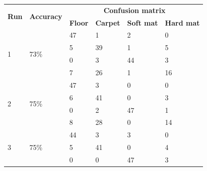 \documentclass[USenglish]{ifimaster}  %
\begin{document}
\begin{table}[h]
	\centering
	\begin{tabular}{@{}llllll@{}}
		\toprule
		\multirow{2}{*}{\textbf{Run}} & \multirow{2}{*}{\textbf{Accuracy}} & \multicolumn{4}{c}{\textbf{Confusion matrix}} \\ \cmidrule(l){3-6} 
		&  & \multicolumn{1}{l|}{\textbf{Floor}} & \multicolumn{1}{l|}{\textbf{Carpet}} & \multicolumn{1}{l|}{\textbf{Soft mat}} & \textbf{Hard mat} \\ \midrule
		\multicolumn{1}{l|}{\multirow{4}{*}{1}} & \multicolumn{1}{l|}{\multirow{4}{*}{73\%}} & \multicolumn{1}{l|}{47} & \multicolumn{1}{l|}{1} & \multicolumn{1}{l|}{2} & 0 \\ \cmidrule(l){3-6} 
		\multicolumn{1}{l|}{} & \multicolumn{1}{l|}{} & \multicolumn{1}{l|}{5} & \multicolumn{1}{l|}{39} & \multicolumn{1}{l|}{1} & 5 \\ \cmidrule(l){3-6} 
		\multicolumn{1}{l|}{} & \multicolumn{1}{l|}{} & \multicolumn{1}{l|}{0} & \multicolumn{1}{l|}{3} & \multicolumn{1}{l|}{44} & 3 \\ \cmidrule(l){3-6} 
		\multicolumn{1}{l|}{} & \multicolumn{1}{l|}{} & \multicolumn{1}{l|}{7} & \multicolumn{1}{l|}{26} & \multicolumn{1}{l|}{1} & 16 \\ \midrule
		\multicolumn{1}{l|}{\multirow{4}{*}{2}} & \multicolumn{1}{l|}{\multirow{4}{*}{75\%}} & \multicolumn{1}{l|}{47} & \multicolumn{1}{l|}{3} & \multicolumn{1}{l|}{0} & 0 \\ \cmidrule(l){3-6} 
		\multicolumn{1}{l|}{} & \multicolumn{1}{l|}{} & \multicolumn{1}{l|}{6} & \multicolumn{1}{l|}{41} & \multicolumn{1}{l|}{0} & 3 \\ \cmidrule(l){3-6} 
		\multicolumn{1}{l|}{} & \multicolumn{1}{l|}{} & \multicolumn{1}{l|}{0} & \multicolumn{1}{l|}{2} & \multicolumn{1}{l|}{47} & 1 \\ \cmidrule(l){3-6} 
		\multicolumn{1}{l|}{} & \multicolumn{1}{l|}{} & \multicolumn{1}{l|}{8} & \multicolumn{1}{l|}{28} & \multicolumn{1}{l|}{0} & 14 \\ \midrule
		\multicolumn{1}{l|}{\multirow{4}{*}{3}} & \multicolumn{1}{l|}{\multirow{4}{*}{75\%}} & \multicolumn{1}{l|}{44} & \multicolumn{1}{l|}{3} & \multicolumn{1}{l|}{3} & 0 \\ \cmidrule(l){3-6} 
		\multicolumn{1}{l|}{} & \multicolumn{1}{l|}{} & \multicolumn{1}{l|}{5} & \multicolumn{1}{l|}{41} & \multicolumn{1}{l|}{0} & 4 \\ \cmidrule(l){3-6} 
		\multicolumn{1}{l|}{} & \multicolumn{1}{l|}{} & \multicolumn{1}{l|}{0} & \multicolumn{1}{l|}{0} & \multicolumn{1}{l|}{47} & 3 \\ \cmidrule(l){3-6} 

\end{tabular}
\end{table}
\end{document}
